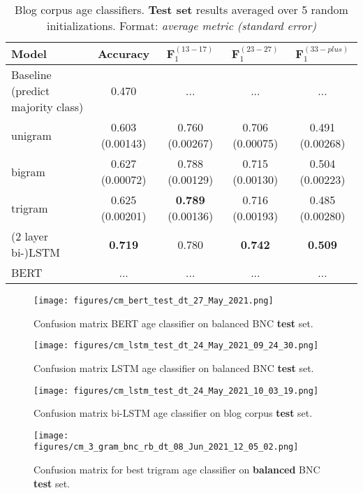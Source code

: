 \begin{table}[H]
    \centering
    \begin{tabular}{l c c c c}
    \hline
    \textbf{Model} & \textbf{Accuracy} & $\boldsymbol{F}_1^{(13-17)}$ & $\boldsymbol{F}_1^{(23-27)}$ & $\boldsymbol{F}_1^{(33-plus)}$\\
    \hline
    Baseline (predict majority class) & 0.470 & ... & ... & ...\\
    unigram & 0.603 (0.00143) & 0.760 (0.00267) & 0.706 (0.00075) & 0.491 (0.00268)\\
    bigram & 0.627 (0.00072) & 0.788 (0.00129) & 0.715 (0.00130) & 0.504 (0.00223)\\
    trigram & 0.625 (0.00201) & \textbf{0.789} (0.00136) & 0.716 (0.00193) & 0.485 (0.00280)\\
    (2 layer bi-)LSTM & \textbf{0.719} & 0.780 & \textbf{0.742} & \textbf{0.509}\\
    BERT & ... & ... & ... & ...\\
    \hline
    \end{tabular}
    \caption{Blog corpus age classifiers. \textbf{Test set} results averaged over 5 random initializations. Format: \textit{average metric (standard error)}}
    \label{tab:blog_classification}
\end{table}

\begin{figure}[H]
    \centering
    \texttt{[image: figures/cm\_bert\_test\_dt\_27\_May\_2021.png]}
    \caption{Confusion matrix BERT age classifier on balanced BNC \textbf{test} set.}
    \label{fig:cm_bert_bnc_rb}
\end{figure}

\begin{figure}[H]
    \centering
    \texttt{[image: figures/cm\_lstm\_test\_dt\_24\_May\_2021\_09\_24\_30.png]}
    \caption{Confusion matrix LSTM age classifier on balanced BNC \textbf{test} set.}
    \label{fig:cm_lstm_bnc_rb}
\end{figure}

\begin{figure}[H]
    \centering
    \texttt{[image: figures/cm\_lstm\_test\_dt\_24\_May\_2021\_10\_03\_19.png]}
    \caption{Confusion matrix bi-LSTM age classifier on blog corpus \textbf{test} set.}
    \label{fig:cm_lstm_blog}
\end{figure}

\begin{figure}[H]
    \centering
    \texttt{[image: figures/cm\_3\_gram\_bnc\_rb\_dt\_08\_Jun\_2021\_12\_05\_02.png]}
    \caption{Confusion matrix for best trigram age classifier on \textbf{balanced} BNC \textbf{test} set.}
    \label{fig:cm_trigram_bnc_rb}
\end{figure}

